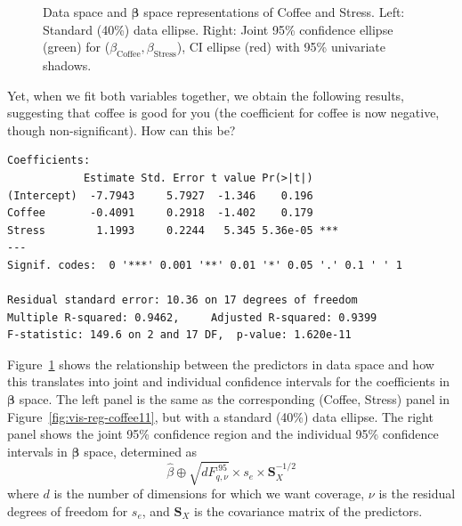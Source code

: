 \documentclass[11pt]{article}%
\newcommand*{\figref}[1]{Figure~\ref{#1}}
\renewcommand*{\vec}[1]{\ensuremath{\bm{#1}}}
\newcommand*{\mat}[1]{\ensuremath{\bm{#1}}}
\begin{document}
\begin{figure}[htb]
\begin{minipage}[c]{.485\textwidth}
  \end{minipage}
  \caption{Data space and $\vec{\beta}$ space representations of Coffee and Stress.
   Left: Standard (40\%) data ellipse. Right: Joint 95\% confidence ellipse (green) for
   ($\beta_{\mathrm{Coffee}}, \beta_{\mathrm{Stress}}$), CI ellipse (red) with 95\% univariate shadows.
  }%
  \label{fig:vis-reg-coffee12}
\end{figure}
Yet, when we fit both variables together, we obtain the following results,
suggesting that coffee is good for you (the coefficient for coffee is now
negative, though non-significant).  How can this be?

\begin{verbatim}
Coefficients:
            Estimate Std. Error t value Pr(>|t|)
(Intercept)  -7.7943     5.7927  -1.346    0.196
Coffee       -0.4091     0.2918  -1.402    0.179
Stress        1.1993     0.2244   5.345 5.36e-05 ***
---
Signif. codes:  0 '***' 0.001 '**' 0.01 '*' 0.05 '.' 0.1 ' ' 1

Residual standard error: 10.36 on 17 degrees of freedom
Multiple R-squared: 0.9462,     Adjusted R-squared: 0.9399
F-statistic: 149.6 on 2 and 17 DF,  p-value: 1.620e-11
\end{verbatim}

\figref{fig:vis-reg-coffee12} shows the relationship between the
predictors in data space and how this translates into joint and
individual confidence intervals for the coefficients in
$\vec{\beta}$ space.  The left panel is the same as the corresponding
(Coffee, Stress) panel in \figref{fig:vis-reg-coffee11}, but with
a standard (40\%) data ellipse. The right panel shows the joint 95\% confidence
region and the individual 95\% confidence intervals in $\vec{\beta}$ space, determined as
\begin{equation*}
 \widehat{\beta} \oplus \sqrt{d F^{.95}_{q, \nu}} \times s_e \times \mat{S}_X^{-1/2}
\end{equation*}
where $d$ is the number of dimensions for which we want coverage,
$\nu$ is the residual degrees of freedom for $s_e$, and $\mat{S}_X$
is the covariance matrix of the predictors.
\end{document}
